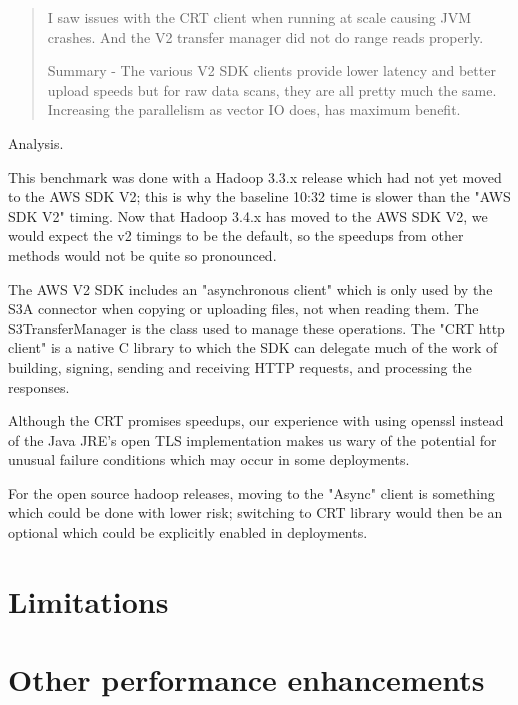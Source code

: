 \documentclass[manuscript]{acmart}
\begin{document}
\begin{quotation}

I saw issues with the CRT client when running at scale causing JVM crashes.
And the V2 transfer manager did not do range reads properly.

Summary - The various V2 SDK clients provide lower latency and better upload speeds but for raw data scans,
they are all pretty much the same.
Increasing the parallelism as vector IO does, has maximum benefit.
\end{quotation}

Analysis.

This benchmark was done with a Hadoop 3.3.x release which had not yet moved to
the AWS SDK V2; this is why the baseline 10:32 time is slower than the "AWS SDK V2"
timing.
Now that Hadoop 3.4.x has moved to the AWS SDK V2, we would expect the v2 timings to
be the default, so the speedups from other methods would not be quite so pronounced.

The AWS V2 SDK includes an "asynchronous client" which is only used by the S3A
connector when copying or uploading files, not when reading them.
The S3TransferManager is the class used to manage these operations.
The "CRT http client" is a native C library to which the SDK can delegate much
of the work of building, signing, sending and receiving HTTP requests, and processing
the responses.

Although the CRT promises speedups, our experience with using openssl instead of
the Java JRE's open TLS implementation makes us wary of the potential for
unusual failure conditions which may occur in some deployments.

For the open source hadoop releases, moving to the "Async" client is something
which could be done with lower risk; switching to CRT library would then be
an optional which could be explicitly enabled in deployments.


\section{Limitations}
\label{sec:limitations}


\section{Other performance enhancements}
\label{sec:enhancements}
\end{document}

